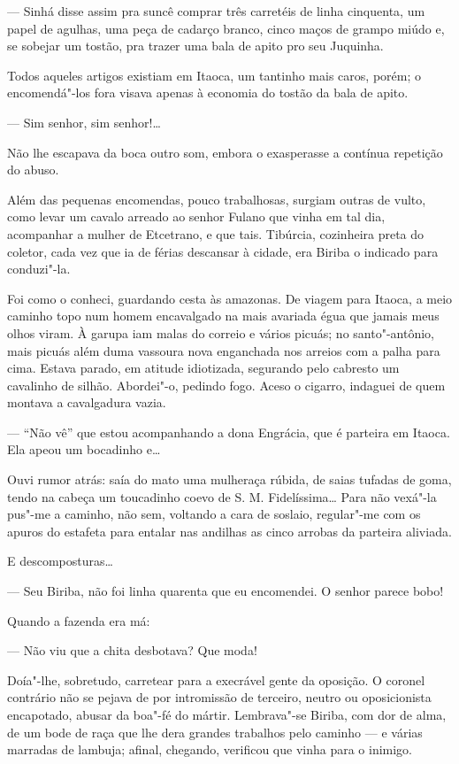 --- Sinhá disse assim pra suncê comprar três carretéis de linha
cinquenta, um papel de agulhas, uma peça de cadarço branco, cinco maços
de grampo miúdo e, se sobejar um tostão, pra trazer uma bala de apito
pro seu Juquinha.

Todos aqueles artigos existiam em Itaoca, um tantinho mais caros, porém;
o encomendá"-los fora visava apenas à economia do tostão da bala de
apito.

--- Sim senhor, sim senhor!\ldots{}

Não lhe escapava da boca outro som, embora o exasperasse a contínua
repetição do abuso.

Além das pequenas encomendas, pouco trabalhosas, surgiam outras de
vulto, como levar um cavalo arreado ao senhor Fulano que vinha em tal
dia, acompanhar a mulher de Etcetrano, e que tais. Tibúrcia, cozinheira
preta do coletor, cada vez que ia de férias descansar à cidade, era
Biriba o indicado para conduzi"-la.

Foi como o conheci, guardando cesta às amazonas. De viagem para Itaoca,
a meio caminho topo num homem encavalgado na mais avariada égua que
jamais meus olhos viram. À garupa iam malas do correio e vários picuás;
no santo"-antônio, mais picuás além duma vassoura nova enganchada nos
arreios com a palha para cima. Estava parado, em atitude idiotizada,
segurando pelo cabresto um cavalinho de silhão. Abordei"-o, pedindo fogo.
Aceso o cigarro, indaguei de quem montava a cavalgadura vazia.

--- ``Não vê'' que estou acompanhando a dona Engrácia, que é parteira em
Itaoca. Ela apeou um bocadinho e\ldots{}

Ouvi rumor atrás: saía do mato uma mulheraça rúbida, de saias tufadas de
goma, tendo na cabeça um toucadinho coevo de S. M. Fidelíssima\ldots{} Para
não vexá"-la pus"-me a caminho, não sem, voltando a cara de soslaio,
regular"-me com os apuros do estafeta para entalar nas andilhas as cinco
arrobas da parteira aliviada.

E descomposturas\ldots{}

--- Seu Biriba, não foi linha quarenta que eu encomendei. O senhor
parece bobo!

Quando a fazenda era má:

--- Não viu que a chita desbotava? Que moda!

Doía"-lhe, sobretudo, carretear para a execrável gente da oposição. O
coronel contrário não se pejava de por intromissão de terceiro, neutro
ou oposicionista encapotado, abusar da boa"-fé do mártir. Lembrava"-se
Biriba, com dor de alma, de um bode de raça que lhe dera grandes
trabalhos pelo caminho --- e várias marradas de lambuja; afinal,
chegando, verificou que vinha para o inimigo.

